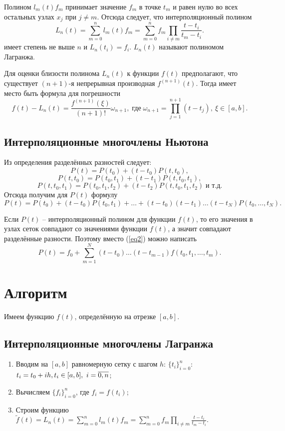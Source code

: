 \documentclass[
11pt,
master, %
subf, %
href, %
colorlinks=true, %
times, %
]{disser}
\begin{document}
Полином $l_m(t)f_m$ принимает значение $f_m$ в точке $t_m$ и равен нулю во всех остальных узлах $x_j$ при $j\neq m$. Отсюда следует, что интерполяционный полином
\begin{equation}
\label{eq1}
L_n(t) = \sum_{m=0}^{n}l_m(t)f_m=\sum_{m=0}^{n}f_m\prod_{i\neq m} \frac{t-t_i}{t_m-t_i}.
\end{equation}
имеет степень не выше $n$ и $L_n(t_i)=f_i$. $L_n(t)$ называют полиномом Лагранжа.

Для оценки близости полинома $L_n(t)$ к функции $f(t)$ предполагают, что существует $(n+1)$-я непрерывная производная $f^{(n+1)}(t)$. Тогда имеет место быть формула для погрешности
$$f(t)-L_n(t)=\frac{f^{(n+1)}(\xi)}{(n+1)!}\omega_{n+1},\;\text{где}\;\omega_{n+1} = \prod_{j=1}^{n+1}(t-t_j), ~ \xi \in [a,b].$$

\subsection{Интерполяционные многочлены Ньютона}
Из определения разделённых разностей следует:
$$P(t)=P(t_0)+(t-t_0)P(t,t_0),$$
$$P(t,t_0)=P(t_0,t_1)+(t-t_1)P(t,t_0,t_1),$$
$$P(t,t_0,t_1)=P(t_0,t_1,t_2)+(t-t_2)P(t,t_0,t_1,t_2)\;\text{и т.д.}$$
Отсюда получим для $P(t)$ формулу
\begin{equation}
\label{eq2}
P(t) = P(t_0) + (t-t_0)P(t_0,t_1) + \ldots + (t-t_0)(t-t_1)\ldots(t-t_N)P(t_0,\ldots, t_N).
\end{equation}

Если $P(t)$ -- интерполяционный полином для функции $f(t)$, то его значения в узлах сеток совпадают со значениями функции $f(t)$, а значит совпадают разделённые разности. Поэтому вместо (\ref{eq2}) можно написать
$$P(t) = f_0 + \sum_{m=1}^{N}(t-t_0)\ldots(t-t_{m-1})f(t_0,t_1,\ldots,t_m).$$

\newpage
\section{Алгоритм}
Имеем функцию $f(t)$, определённую на отрезке $[a,b]$.
\subsection{Интерполяционные многочлены Лагранжа}
\begin{enumerate}
  \item Вводим на $[a,b]$ равномерную сетку с шагом $h$: $\{t_i\}_{i=0}^n$: $t_i = t_0 + ih,\\
   t_i\in[a,b], ~ i=\overline{0,n}$;
  \item Вычисляем $\{f_i\}_{i=0}^n$, где $f_i=f(t_i)$;
  \item Строим функцию $\displaystyle\tilde{f}(t)=L_n(t)=\sum_{m=0}^{n}l_m(t)f_m =\sum_{m=0}^{n}f_m\prod_{i\neq m} \frac{t-t_i}{t_m-t_i}$.
\end{enumerate}
\end{document}
